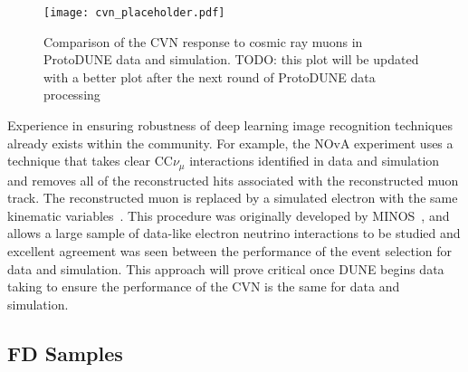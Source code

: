 \begin{figure}
    \centering
    \texttt{[image: cvn\_placeholder.pdf]}
    \caption{Comparison of the CVN response to cosmic ray muons in ProtoDUNE data and simulation. TODO: this plot will be updated with a better plot after the next round of ProtoDUNE data processing}
    \label{fig:protodunecvn}
\end{figure}

Experience in ensuring robustness of deep learning image recognition techniques already exists within the community. For example, the NOvA experiment uses a technique that takes clear CC$\nu_\mu$ interactions identified in data and simulation and removes all of the reconstructed hits associated with the reconstructed muon track. The reconstructed muon is replaced by a simulated electron with the same kinematic variables~\cite{NOvA_MRE}. This procedure was originally developed by MINOS~\cite{MINOS_MRE}, and allows a large sample of data-like electron neutrino interactions to be studied and excellent agreement was seen between the performance of the event selection for data and simulation. This approach will prove critical once DUNE begins data taking to ensure the performance of the CVN is the same for data and simulation.
\subsection{FD Samples}

